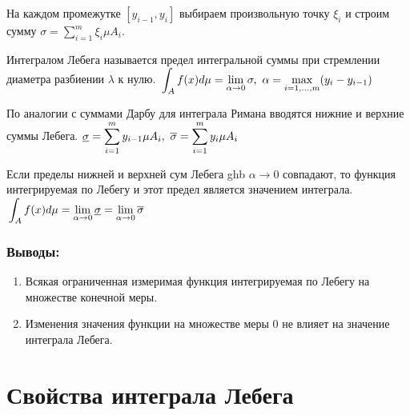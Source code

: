 \documentclass[12pt]{report}
\newcommand{\be}{\begin{enumerate}}
\newcommand{\ee}{\end{enumerate}}
\renewcommand{\[}{$\\\displaystyle}
\renewcommand{\]}{\\$}
\renewcommand{\[}{$\\\displaystyle}
\newcommand{\sep}{,\ }
\begin{document}
На каждом промежутке $[y_{i-1}, y_i]$ выбираем произвольную точку $\xi_i$ и строим сумму $\sigma = \sum _{i=1}^m \xi_i \mu A_i$.

Интегралом Лебега называется предел интегральной суммы при стремлении диаметра разбиении $\lambda$ к нулю.
\[\int_A f(x) d\mu=\lim_{\alpha \rightarrow 0} \sigma \sep \alpha=\max_{i=1,\dots,m}(y_i-y_{i-1})\]

По аналогии с суммами Дарбу для интеграла Римана вводятся нижние и верхние суммы Лебега.
\[\underline{\sigma} = \sum _{i=1}^m y_{i-1}\mu A_i \sep \overline{\sigma} = \sum _{i=1}^m y_{i}\mu A_i\]

Если пределы нижней и верхней сум Лебега ghb $\alpha \rightarrow 0$ совпадают, то функция интегрируемая по Лебегу и этот предел является значением интеграла.
\[\int_A f(x) d\mu=\lim_{\alpha \rightarrow 0} \underline{\sigma} = \lim_{\alpha \rightarrow 0} \overline{\sigma}\]

\subsubsection{Выводы:}
\be
  \item Всякая ограниченная измеримая функция интегрируемая по Лебегу на множестве конечной меры.
  \item Изменения значения функции на множестве меры 0 не влияет на значение интеграла Лебега.
\ee

\section{Свойства интеграла Лебега}
\end{document}
